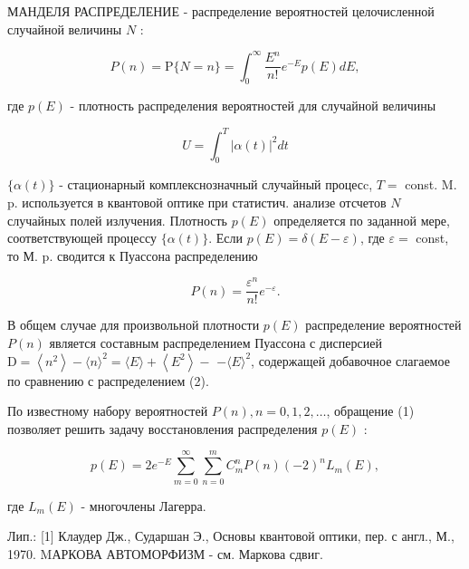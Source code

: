 \documentclass[10pt]{article}
\begin{document}
МАНДЕЛЯ РАСПРЕДЕЛЕНИЕ - распределение вероятностей целочисленной случайной величины $N$ :



\[

P(n)=\mathrm{P}\{N=n\}=\int_{0}^{\infty} \frac{E^{n}}{n !} e^{-E} p(E) d E,

\]



где $p(E)$ - плотность распределения вероятностей для случайной величины



\[

U=\int_{0}^{T}|\alpha(t)|^{2} d t

\]



$\{\alpha(t)\}$ - стационарный комплекснозначный случайный процесc, $T=$ const. M. p. используется в квантовой оптике при статистич. анализе отсчетов $N$ случайных полей излучения. Плотность $p(E)$ определяется по заданной мере, соответствующей процессу $\{\alpha(t)\}$. Если $p(E)=\delta(E-\varepsilon)$, где $\varepsilon=$ const, то М. p. сводится к Пуассона распределению



\[

P(n)=\frac{\varepsilon^{n}}{n !} e^{-\varepsilon} .

\]



В общем случае для произвольной плотности $p(E)$ распределение вероятностей $P(n)$ является составным распределением Пуассона с дисперсией $\mathrm{D}=\left\langle n^{2}\right\rangle-\langle n\rangle^{2}=\langle E\rangle+\left\langle E^{2}\right\rangle-$ $-\langle E\rangle^{2}$, содержащей добавочное слагаемое по сравнению с распределением (2).



По известному набору вероятностей $P(n), n=0,1,2, \ldots$, обращение (1) позволяет решить задачу восстановления распределения $p(E)$ :



\[

p(E)=2 e^{-E} \sum_{m=0}^{\infty} \sum_{n=0}^{m} C_{m}^{n} P(n)(-2)^{n} L_{m}(E),

\]



где $L_{m}(E)$ - многочлены Лагерра.



Лип.: [1] Клаудер Дж., Сударшан Э., Основы квантовой оптики, пер. с англ., М., 1970. MАРКОВА АВТОМОРФИЗМ - см. Маркова сдвиг.
\end{document}
